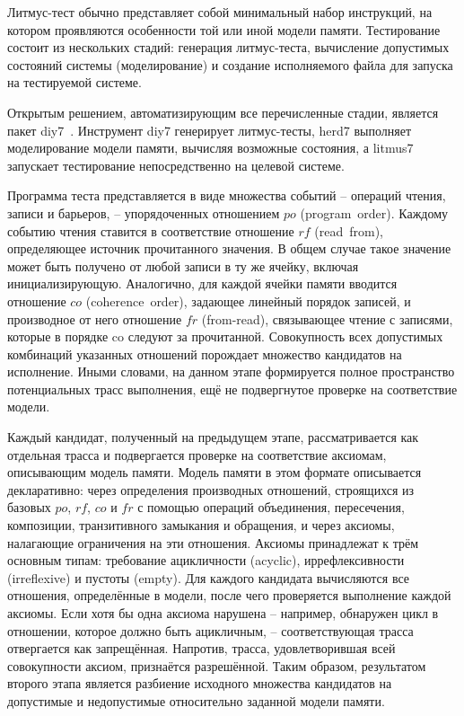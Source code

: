Литмус-тест обычно представляет собой минимальный набор инструкций,
на котором проявляются особенности той или иной модели памяти.
Тестирование состоит из нескольких стадий: генерация литмус-теста,
вычисление допустимых состояний системы (моделирование) и создание
исполняемого файла для запуска на тестируемой системе.

Открытым решением, автоматизирующим все перечисленные стадии,
является пакет diy7~\cite{diy7}. Инструмент diy7 генерирует
литмус-тесты, herd7 выполняет моделирование модели памяти, вычисляя
возможные состояния, а litmus7 запускает тестирование непосредственно
на целевой системе.

Программа теста представляется в виде множества событий -- операций
чтения, записи и барьеров, -- упорядоченных отношением $po$ (program~order).
Каждому событию чтения ставится в соответствие отношение $rf$
(read~from), определяющее источник прочитанного значения.
В общем случае такое значение может быть получено от любой записи в
ту же ячейку, включая инициализирующую.
Аналогично, для каждой ячейки памяти вводится отношение $co$
(coherence~order), задающее линейный порядок записей, и производное
от него отношение $fr$ (from-read), связывающее чтение с записями,
которые в порядке co следуют за прочитанной.
Совокупность всех допустимых комбинаций указанных отношений порождает
множество кандидатов на исполнение.
Иными словами, на данном этапе формируется полное пространство
потенциальных трасс выполнения, ещё не подвергнутое проверке на
соответствие модели.

Каждый кандидат, полученный на предыдущем этапе, рассматривается как
отдельная трасса и подвергается проверке на соответствие аксиомам,
описывающим модель памяти.
Модель памяти в этом формате описывается декларативно: через
определения производных отношений, строящихся из базовых $po$, $rf$,
$co$ и $fr$ с помощью операций объединения, пересечения, композиции,
транзитивного замыкания и обращения, и через аксиомы, налагающие
ограничения на эти отношения.
Аксиомы принадлежат к трём основным типам: требование ацикличности
(acyclic), иррефлексивности (irreflexive) и пустоты (empty).
Для каждого кандидата вычисляются все отношения, определённые в
модели, после чего проверяется выполнение каждой аксиомы.
Если хотя бы одна аксиома нарушена -- например, обнаружен цикл в
отношении, которое должно быть ацикличным, -- соответствующая трасса
отвергается как запрещённая.
Напротив, трасса, удовлетворившая всей совокупности аксиом,
признаётся разрешённой.
Таким образом, результатом второго этапа является разбиение исходного
множества кандидатов на допустимые и недопустимые относительно
заданной модели памяти.

